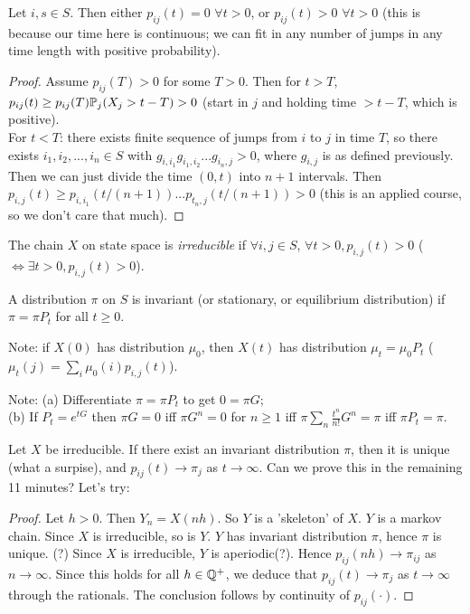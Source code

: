 \documentclass[a4paper]{article}
\begin{document}
\begin{lemma}
Let $i,s \in S$. Then either $p_{ij}(t)=0$ $\forall t>0$, or $p_{ij}(t) > 0$ $\forall t > 0$ (this is because our time here is continuous; we can fit in any number of jumps in any time length with positive probability).
\begin{proof}
Assume $p_{ij}(T) > 0$ for some $T>0$. Then for $t>T$, $p_{ij}(t) \geq p_{ij}(T) \P_j (X_j > t-T) > 0$ (start in $j$ and holding time $> t-T$, which is positive).\\
For $t<T$: there exists finite sequence of jumps from $i$ to $j$ in time $T$, so there exists $i_1,i_2,...,i_n \in S$ with $g_{i,i_1}g_{i_1,i_2}...g_{i_n,j}>0$, where $g_{i,j}$ is as defined previously. Then we can just divide the time $(0,t)$ into $n+1$ intervals. Then $p_{i,j}(t) \geq p_{i,i_1}(t/(n+1))...p_{t_n,j}(t/(n+1)) > 0$ (this is an applied course, so we don't care that much).
\end{proof}
\end{lemma}

\begin{defi}
The chain $X$ on state space is \emph{irreducible} if $\forall i,j \in S$, $\forall t > 0, p_{i,j}(t)>0$ ($\iff \exists t>0, p_{i,j}(t)>0$).
\end{defi}

A distribution $\pi$ on $S$ is invariant (or stationary, or equilibrium distribution) if $\pi = \pi P_t$ for all $t \geq 0$.

Note: if $X(0)$ has distribution $\mu_0$, then $X(t)$ has distribution $\mu_t = \mu_0 P_t$ ($\mu_t(j) = \sum_i \mu_0(i) p_{i,j}(t)$).

Note: (a) Differentiate $\pi = \pi P_t$ to get $0 = \pi G$;\\
(b) If $P_t = e^{tG}$ then $\pi G = 0$ iff $\pi G^n = 0$ for $n \geq 1$ iff $\pi \sum_n \frac{t^n}{n!} G^n = \pi$ iff $\pi P_t = \pi$.

\begin{thm}
Let $X$ be irreducible. If there exist an invariant distribution $\pi$, then it is unique (what a surpise), and $p_{ij}(t) \to \pi_j$ as $t\to \infty$. Can we prove this in the remaining 11 minutes? Let's try:
\begin{proof}
Let $h>0$. Then $Y_n=X(nh)$. So $Y$ is a 'skeleton' of $X$. $Y$ is a markov chain. Since $X$ is irreducible, so is $Y$. $Y$ has invariant distribution $\pi$, hence $\pi$ is unique. (?) Since $X$ is irreducible, $Y$ is aperiodic(?). Hence $p_{ij}(nh) \to \pi_{ij}$ as $n \to \infty$. Since this holds for all $h \in \Q^+$, we deduce that $p_{ij}(t) \to \pi_j$ as $t\to \infty$ through the rationals. The conclusion follows by continuity of $p_{ij}(\cdot)$.
\end{proof}
\end{thm}
\end{document}
